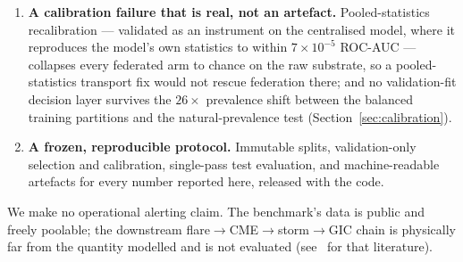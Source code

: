\begin{enumerate}[leftmargin=2em, itemsep=3pt]
  centralised model's ROC-AUC level, so the collapse is dominated by
  BatchNorm under federation, not by the flattened-feature encoder
  and not by federation per se (Section~\ref{sec:results}).
  \item \textbf{A calibration failure that is real, not an
  artefact.} Pooled-statistics recalibration --- validated as an
  instrument on the centralised model, where it reproduces the
  model's own statistics to within $7\times10^{-5}$ ROC-AUC ---
  collapses every federated arm to chance on the raw substrate, so a
  pooled-statistics transport fix would not rescue federation there;
  and no validation-fit decision layer survives the $26\times$
  prevalence shift between the balanced training partitions and the
  natural-prevalence test (Section~\ref{sec:calibration}).
  \item \textbf{A frozen, reproducible protocol.} Immutable splits,
  validation-only selection and calibration, single-pass test
  evaluation, and machine-readable artefacts for every number
  reported here, released with the code.
\end{enumerate}

We make no operational alerting claim. The benchmark's data is
public and freely poolable; the downstream
flare$\to$CME$\to$storm$\to$GIC chain is physically far from the
quantity modelled and is not evaluated (see~\cite{boteler2019} for
that literature).
